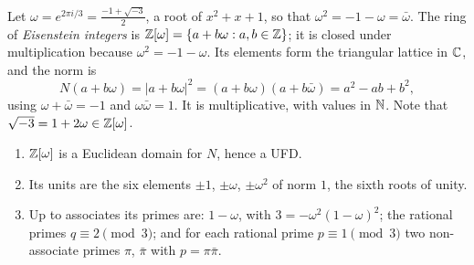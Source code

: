 Let $\omega = e^{2\pi i/3} = \frac{-1 + \sqrt{-3}}{2}$, a root of $x^2 + x + 1$, so that $\omega^2 = -1 - \omega = \bar\omega$. The ring of \emph{Eisenstein integers} is
$\mathbb{Z}[\omega] = \{a + b\omega : a, b \in \mathbb{Z}\}$; it is closed under multiplication because $\omega^2 = -1 - \omega$. Its elements form the triangular lattice in $\mathbb{C}$, and the norm is
\[
N(a + b\omega) = |a + b\omega|^2 = (a + b\omega)(a + b\bar\omega) = a^2 - ab + b^2,
\]
using $\omega + \bar\omega = -1$ and $\omega\bar\omega = 1$. It is multiplicative, with values in $\mathbb{N}$. Note that $\sqrt{-3} = 1 + 2\omega \in \mathbb{Z}[\omega]$.

\begin{proposition}\label{number-theory:proposition-eisenstein}
\begin{enumerate}
\item $\mathbb{Z}[\omega]$ is a Euclidean domain for $N$, hence a UFD.
\item Its units are the six elements $\pm1$, $\pm\omega$, $\pm\omega^2$ of norm $1$, the sixth roots of unity.
\item Up to associates its primes are: $1 - \omega$, with $3 = -\omega^2(1 - \omega)^2$; the rational primes $q \equiv 2 \pmod 3$; and for each rational prime $p \equiv 1 \pmod 3$ two non-associate primes
$\pi$, $\bar\pi$ with $p = \pi\bar\pi$.
\end{enumerate}
\end{proposition}

